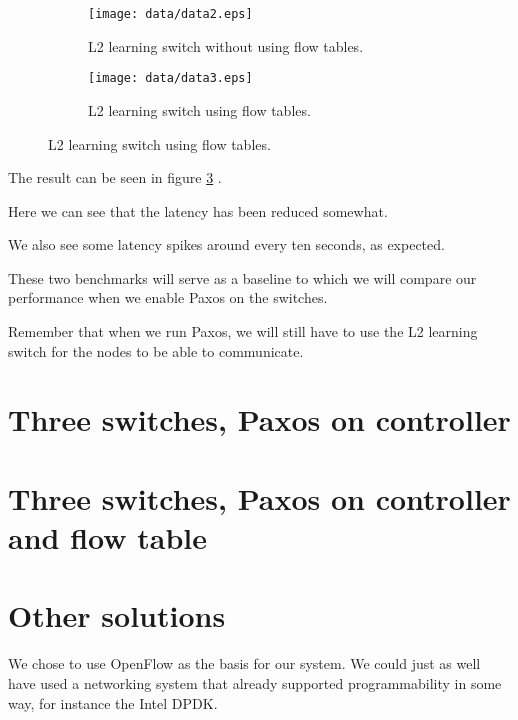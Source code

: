 \begin{figure}
  \centering
  \begin{subfigure}{\textwidth}
    \centering
    \texttt{[image: data/data2.eps]}
    \caption{L2 learning switch without using flow tables.}
    \label{benchmark:l2.learning.switch.no.flows}
  \end{subfigure}

  \centering
  \begin{subfigure}{\textwidth}
    \centering
    \texttt{[image: data/data3.eps]}
    \caption{L2 learning switch using flow tables.}
    \label{benchmark:l2.learning.switch.with.flows}
  \end{subfigure}
\end{figure}

The result can be seen in figure \ref{benchmark:l2.learning.switch.with.flows}
.

Here we can see that the latency has been reduced somewhat.

We also see some latency spikes around every ten seconds, as expected.


These two benchmarks will serve as a baseline to which we will compare our
performance when we enable Paxos on the switches.

Remember that when we run Paxos, we will still have to use the L2 learning
switch for the nodes to be able to communicate.


\section{Three switches, Paxos on controller}


\section{Three switches, Paxos on controller and flow table}


\section{Other solutions}

We chose to use OpenFlow as the basis for our system.
We could just as well have used a networking system that already supported
programmability in some way, for instance the Intel DPDK.

